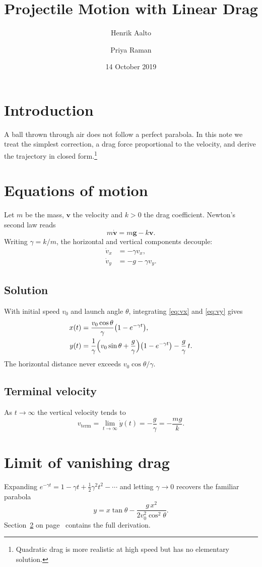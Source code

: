 \documentclass[12pt,a4paper]{article}
\title{Projectile Motion with Linear Drag}
\author{Henrik Aalto \and Priya Raman}
\date{14 October 2019}
\newcommand{\vv}{\mathbf{v}}
\newcommand{\g}{\mathbf{g}}
\begin{document}
\maketitle
\tableofcontents

\section{Introduction}
A ball thrown through air does not follow a perfect parabola. In this note we treat the simplest correction, a drag force proportional to the velocity, and derive the trajectory in closed form.\footnote{Quadratic drag is more realistic at high speed but has no elementary solution.}

\section{Equations of motion}\label{sec:eom}
Let $m$ be the mass, $\vv$ the velocity and $k>0$ the drag coefficient. Newton's second law reads
\begin{equation}\label{eq:newton}
  m\dot{\vv} = m\g - k\vv .
\end{equation}
Writing $\gamma = k/m$, the horizontal and vertical components decouple:
\begin{align}
  \dot v_x &= -\gamma v_x, \label{eq:vx}\\
  \dot v_y &= -g - \gamma v_y. \label{eq:vy}
\end{align}

\subsection{Solution}
With initial speed $v_0$ and launch angle $\theta$, integrating \eqref{eq:vx} and \eqref{eq:vy} gives
\begin{align*}
  x(t) &= \frac{v_0\cos\theta}{\gamma}\bigl(1-e^{-\gamma t}\bigr),\\
  y(t) &= \frac{1}{\gamma}\Bigl(v_0\sin\theta+\frac{g}{\gamma}\Bigr)\bigl(1-e^{-\gamma t}\bigr)-\frac{g}{\gamma}\,t .
\end{align*}
The horizontal distance never exceeds $v_0\cos\theta/\gamma$.

\subsection{Terminal velocity}
As $t\to\infty$ the vertical velocity tends to
\[
  v_{\mathrm{term}} = \lim_{t\to\infty} \dot y(t) = -\frac{g}{\gamma} = -\frac{mg}{k}.
\]

\section{Limit of vanishing drag}
Expanding $e^{-\gamma t}=1-\gamma t+\tfrac12\gamma^2t^2-\cdots$ and letting $\gamma\to0$ recovers the familiar parabola
\[
  y = x\tan\theta - \frac{g\,x^2}{2v_0^2\cos^2\theta}.
\]
Section~\ref{sec:eom} on page~\pageref{sec:eom} contains the full derivation.
\end{document}
